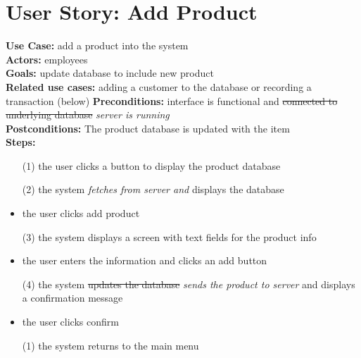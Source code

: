\documentclass[notitlepage,11pt]{article}
\begin{document}
\section{User Story: Add Product}
\textbf{Use Case:} add a product into the system\\
	\textbf{Actors:} employees\\
	\textbf{Goals:} update database to include new product\\
	\textbf{Related use cases:} adding a customer to the database or recording a transaction (below)
	\textbf{Preconditions:} interface is functional and \sout{connected to underlying database} \emph{server is running}\\
	\textbf{Postconditions:} The product database is updated with the item\\
	\textbf{Steps:}
		\begin{itemize}
		\item[(1)] the user clicks a button to display the product database
		\item[(2)] the system \emph{fetches from server and} displays the database
		\item the user clicks add product
		\item[(3)] the system displays a screen with text fields for the product info
		\item the user enters the information and clicks an add button
		\item[(4)] the system \sout{updates the database} \emph{sends the product to server} and displays a confirmation message
		\item the user clicks confirm 
		\item[(1)] the system returns to the main menu
		\end{itemize}
\end{document}
